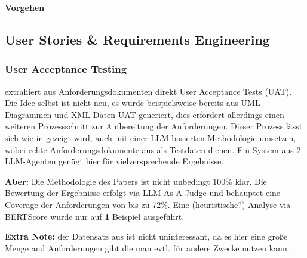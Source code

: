 
\textbf{Vorgehen}

\subsection{User Stories \& Requirements Engineering}

\subsubsection{User Acceptance Testing}

\cite{varpeUserAcceptanceTest2025} extrahiert aus Anforderungsdokumenten direkt User Acceptance Tests (UAT). 
Die Idee selbst ist nicht neu, es wurde beispielsweise bereits aus UML-Diagrammen und XML Daten UAT generiert, dies erfordert allerdings einen weiteren Prozessschritt zur Aufbereitung der Anforderungen. Dieser Prozess lässt sich wie in \cite{varpeUserAcceptanceTest2025} gezeigt wird, auch mit einer LLM basierten Methodologie umsetzen, wobei echte Anforderungsdokumente aus \cite{ferrariPUREDatasetPublic2017a} als Testdaten dienen. Ein System aus 2 LLM-Agenten genügt hier für vielversprechende Ergebnisse.

\textbf{Aber:} Die Methodologie des Papers ist nicht unbedingt 100\% klar. Die Bewertung der Ergebnisse erfolgt via LLM-As-A-Judge und behauptet eine Coverage der Anforderungen von bis zu 72\%. Eine (heuristische?) Analyse via BERTScore wurde nur auf \textbf{1} Beispiel ausgeführt.

\textbf{Extra Note:} der Datensatz aus \cite{ferrariPUREDatasetPublic2017a} ist nicht uninteressant, da es hier eine große Menge and Anforderungen gibt die man evtl. für andere Zwecke nutzen kann. 

